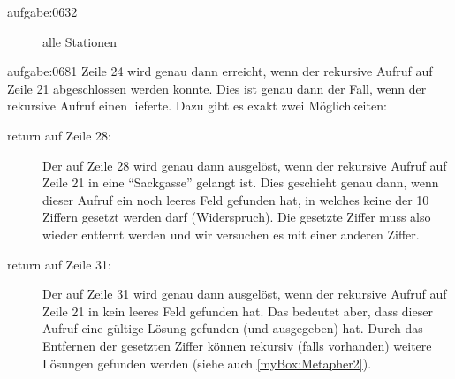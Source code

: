 \begin{antwort}{aufgabe:0632}
\begin{figure}[H]
	\caption{alle Stationen}
	\label{fig:treeB}
	\end{figure}
\end{antwort}



\begin{antwort}{aufgabe:0681}
Zeile 24 wird genau dann erreicht, wenn der rekursive Aufruf auf Zeile 21 abgeschlossen werden konnte. Dies ist genau dann der Fall, wenn der rekursive Aufruf einen  lieferte. Dazu gibt es exakt zwei Möglichkeiten:
\begin{description}
	\item[return auf Zeile 28:] Der  auf Zeile 28 wird genau dann ausgelöst, wenn der rekursive Aufruf auf Zeile 21 in eine \enquote{Sackgasse} gelangt ist. Dies geschieht genau dann, wenn dieser Aufruf ein noch leeres Feld gefunden hat, in welches keine der 10 Ziffern gesetzt werden darf (Widerspruch). Die gesetzte Ziffer muss also wieder entfernt werden und wir versuchen es mit einer anderen Ziffer.
	\item[return auf Zeile 31:] Der  auf Zeile 31 wird genau dann ausgelöst, wenn der rekursive Aufruf auf Zeile 21 in kein leeres Feld gefunden hat. Das bedeutet aber, dass dieser Aufruf eine gültige Lösung gefunden (und ausgegeben) hat. Durch das Entfernen der gesetzten Ziffer können rekursiv (falls vorhanden) weitere Lösungen gefunden werden (siehe auch \cref{myBox:Metapher2}).
\end{description}
\end{antwort}



